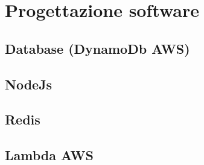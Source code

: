 \chapter{Progettazione software}


\section{Database (DynamoDb AWS)}


\section{NodeJs}

\section{Redis}

\section{Lambda AWS}



